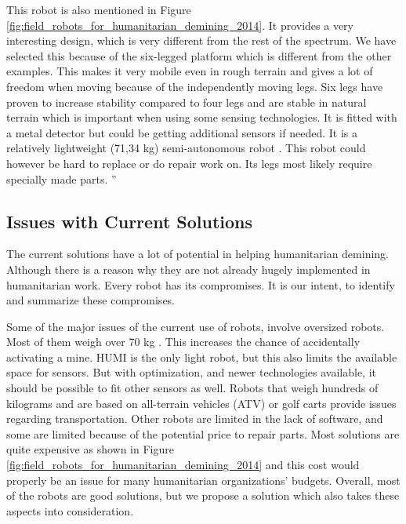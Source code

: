 This robot is also mentioned in Figure \ref{fig:field_robots_for_humanitarian_demining_2014}. It provides a very interesting design, which is very different from the rest of the spectrum. We have selected this because of the six-legged platform which is different from the other examples. This makes it very mobile even in rough terrain and gives a lot of freedom when moving because of the independently moving legs. Six legs have proven to increase stability compared to four legs and are stable in natural terrain which is important when using some sensing technologies. It is fitted with a metal detector but could be getting additional sensors if needed. It is a relatively lightweight (71,34 kg) semi-autonomous robot \cite{6LeggedRobot2007}. This robot could however be hard to replace or do repair work on. Its legs most likely require specially made parts.  ''

\newpage

\subsection{Issues with Current Solutions}

The current solutions have a lot of potential in helping humanitarian demining. Although there is a reason why they are not already hugely implemented in humanitarian work. Every robot has its compromises. It is our intent, to identify and summarize these compromises.

Some of the major issues of the current use of robots, involve oversized robots. Most of them weigh over 70 kg . This increases the chance of accidentally activating a mine. HUMI is the only light robot, but this also limits the available space for sensors. But with optimization, and newer technologies available, it should be possible to fit other sensors as well. Robots that weigh hundreds of kilograms and are based on all-terrain vehicles (ATV) or golf carts provide issues regarding transportation. Other robots are limited in the lack of software, and some are limited because of the potential price to repair parts. Most solutions are quite expensive as shown in Figure \ref{fig:field_robots_for_humanitarian_demining_2014} and this cost would properly be an issue for many humanitarian organizations’ budgets. Overall, most of the robots are good solutions, but we propose a solution which also takes these aspects into consideration.